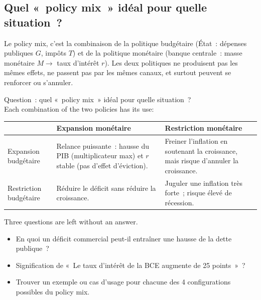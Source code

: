\subsection{Quel «~policy mix~» idéal pour quelle situation~?}

\begin{definition}
  Le policy mix, c'est la combinaison de la politique budgétaire (État~: dépenses
  publiques $G$, impôts $T$) et de la politique monétaire (banque centrale~: masse
  monétaire $M \to$ taux d'intérêt $r$). Les deux politiques ne produisent pas les
  mêmes effets, ne passent pas par les mêmes canaux, et surtout peuvent se renforcer
  ou s'annuler.
\end{definition}

\begin{example}
  Question~: quel «~policy mix~» idéal pour quelle situation~?\\
  Each combination of the two policies has its use:
  \begin{center}
    \small
    \begin{tabularx}{\linewidth}{>{\raggedright\arraybackslash}p{3.2cm}
        >{\raggedright\arraybackslash}X >{\raggedright\arraybackslash}X}
      \toprule
      & Expansion monétaire & Restriction monétaire \\
      \midrule
      Expansion budgétaire & Relance puissante~: hausse du PIB (multiplicateur max) et
        $r$ stable (pas d'effet d'éviction). & Freiner l'inflation en soutenant la
        croissance, mais risque d'annuler la croissance. \\
      \addlinespace
      Restriction budgétaire & Réduire le déficit sans réduire la croissance. & Juguler
        une inflation très forte~; risque élevé de récession. \\
      \bottomrule
    \end{tabularx}
  \end{center}
\end{example}

\begin{remark}
  Three questions are left without an answer.
  \begin{itemize}
    \item En quoi un déficit commercial peut-il entraîner une hausse de la dette
      publique~?
    \item Signification de «~Le taux d'intérêt de la BCE augmente de 25 points~»~?
    \item Trouver un exemple ou cas d'usage pour chacune des 4 configurations possibles
      du policy mix.
  \end{itemize}
\end{remark}


